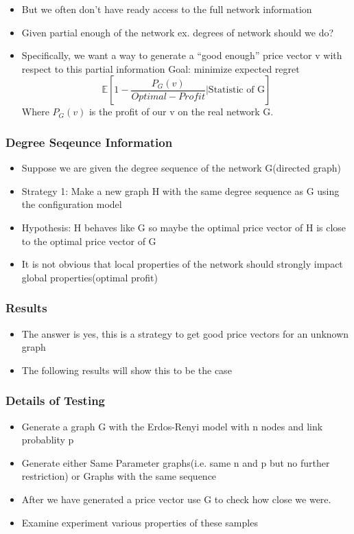 \documentclass[a4paper,12pt]{beamer}
\begin{document}
\begin{frame}
  \begin{itemize}
    \item But we often don't have ready access to the full network information
    \item Given partial enough of the network ex. degrees of network should we do?
    \item Specifically, we want a way to generate a ``good enough'' price vector v with respect to this partial information
          Goal: minimize expected regret
          \begin{equation}
            \mathbb{E} [ 1 - \frac{P_{G}(v)}{Optimal-Profit} | \text{Statistic of G}]
          \end{equation}
          Where $P_{G}(v)$ is the profit of our v on the real network G.
  \end{itemize}
\end{frame}


\begin{frame}
  \frametitle{Degree Seqeunce Information}
  \begin{itemize}
    \item Suppose we are given the degree sequence of the network G(directed graph)
    \item Strategy 1: Make a new graph H with the same degree sequence as G using the configuration model
    \item Hypothesis: H behaves like G so maybe the optimal price vector of H is close to the optimal price vector of G
          \item It is not obvious that local properties of the network should strongly impact global properties(optimal profit)
  \end{itemize}
\end{frame}

\begin{frame}
  \frametitle{Results}
  \begin{itemize}
    \item The answer is yes, this is a strategy to get good price vectors for an unknown graph \\
    \item The following results will show this to be the case
  \end{itemize}
\end{frame}

\begin{frame}
  \frametitle{Details of Testing}
  \begin{itemize}
    \item Generate a graph G with the Erdos-Renyi model with n nodes and link probablity p
    \item Generate either Same Parameter graphs(i.e. same n and p but no further restriction) or Graphs with the same sequence
    \item After we have generated a price vector use G to check how close we were.
    \item Examine experiment various properties of these samples
  \end{itemize}
\end{frame}
\end{document}
